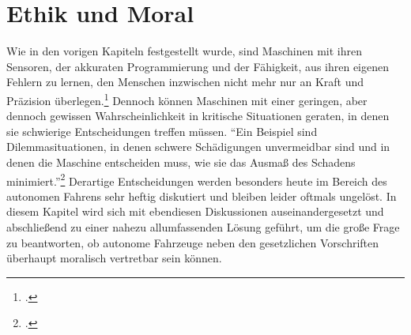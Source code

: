 \documentclass[a4paper, 12pt, openany]{book}
\begin{document}
    
    \chapter{Ethik und Moral}
        Wie in den vorigen Kapiteln festgestellt wurde, sind Maschinen mit ihren Sensoren, der akkuraten Programmierung und der Fähigkeit, aus ihren eigenen Fehlern zu lernen, den Menschen inzwischen nicht mehr nur an Kraft und Präzision überlegen.\footcite[4]{birnbacher2016automatisiertes} Dennoch können Maschinen mit einer geringen, aber dennoch gewissen Wahrscheinlichkeit in kritische Situationen geraten, in denen sie schwierige Entscheidungen treffen müssen. \enquote{Ein Beispiel sind Dilemmasituationen, in denen schwere Schädigungen unvermeidbar sind und in denen die Maschine entscheiden muss, wie sie das Ausmaß des Schadens minimiert.}\footcite[4]{birnbacher2016automatisiertes} Derartige Entscheidungen werden besonders heute im Bereich des autonomen Fahrens sehr heftig diskutiert und bleiben leider oftmals ungelöst. In diesem Kapitel wird sich mit ebendiesen Diskussionen auseinandergesetzt und abschließend zu einer nahezu allumfassenden Lösung geführt, um die große Frage zu beantworten, ob autonome Fahrzeuge neben den gesetzlichen Vorschriften überhaupt moralisch vertretbar sein können.
\end{document}
